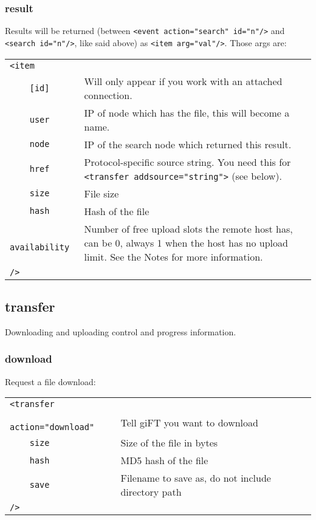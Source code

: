 \documentclass[10pt]{article}
\begin{document}
\subsubsection{result}
Results will be returned (between \verb|<event action="search" id="n"/>| and
\verb|<search id="n"/>|, like said above) as \verb|<item arg="val"/>|. Those
args are:

\begin{tabular}{p{3.1cm}p{8.0cm}}
\verb|<item|        &  \\
\verb|    [id]|     & Will only appear if you work with an attached connection. \\
\verb|    user|     & IP of node which has the file, this will become a name. \\
\verb|    node|     & IP of the search node which returned this result. \\
\verb|    href|     & Protocol-specific source string. You need this for \verb|<transfer addsource="string">| (see below). \\
\verb|    size|     & File size \\
\verb|    hash|     & Hash of the file \\
\verb|    availability| & Number of free upload slots the remote host has, can be 0, always 1 when the host has no upload limit. See the Notes for more information.\\
\verb|/>|           &
\end{tabular}

\subsection{transfer}
Downloading and uploading control and progress information.

\subsubsection{download}
Request a file download:

\begin{tabular}{p{3.9cm}p{7.2cm}}
\verb|<transfer|        &  \\
\verb|    action="download"|    & Tell giFT you want to download \\
\verb|    size|                 & Size of the file in bytes \\
\verb|    hash|                 & MD5 hash of the file \\
\verb|    save|                 & Filename to save as, do not include directory path \\
\verb|/>|           &
\end{tabular}
\end{document}
